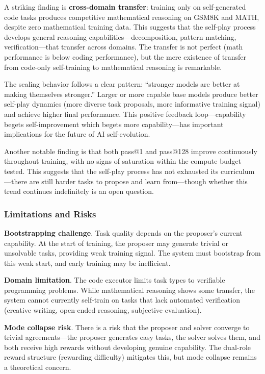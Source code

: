 A striking finding is \textbf{cross-domain transfer}: training only on self-generated code tasks produces competitive mathematical reasoning on GSM8K and MATH, despite zero mathematical training data. This suggests that the self-play process develops general reasoning capabilities---decomposition, pattern matching, verification---that transfer across domains. The transfer is not perfect (math performance is below coding performance), but the mere existence of transfer from code-only self-training to mathematical reasoning is remarkable.

The scaling behavior follows a clear pattern: ``stronger models are better at making themselves stronger.'' Larger or more capable base models produce better self-play dynamics (more diverse task proposals, more informative training signal) and achieve higher final performance. This positive feedback loop---capability begets self-improvement which begets more capability---has important implications for the future of AI self-evolution.

Another notable finding is that both pass@1 and pass@128 improve continuously throughout training, with no signs of saturation within the compute budget tested. This suggests that the self-play process has not exhausted its curriculum---there are still harder tasks to propose and learn from---though whether this trend continues indefinitely is an open question.

\subsubsection{Limitations and Risks}

\textbf{Bootstrapping challenge}. Task quality depends on the proposer's current capability. At the start of training, the proposer may generate trivial or unsolvable tasks, providing weak training signal. The system must bootstrap from this weak start, and early training may be inefficient.

\textbf{Domain limitation}. The code executor limits task types to verifiable programming problems. While mathematical reasoning shows some transfer, the system cannot currently self-train on tasks that lack automated verification (creative writing, open-ended reasoning, subjective evaluation).

\textbf{Mode collapse risk}. There is a risk that the proposer and solver converge to trivial agreements---the proposer generates easy tasks, the solver solves them, and both receive high rewards without developing genuine capability. The dual-role reward structure (rewarding difficulty) mitigates this, but mode collapse remains a theoretical concern.


